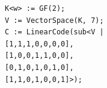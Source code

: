 \begin{verbatim}
K<w> := GF(2);
V := VectorSpace(K, 7);
C := LinearCode(sub<V |
[1,1,1,0,0,0,0],
[1,0,0,1,1,0,0],
[0,1,0,1,0,1,0],
[1,1,0,1,0,0,1]>);
\end{verbatim}
